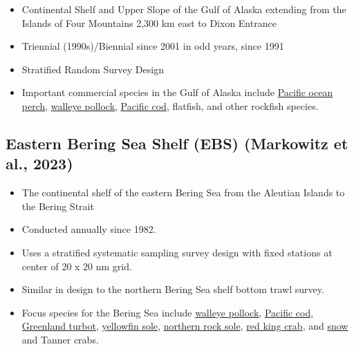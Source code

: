 \documentclass[
  letterpaper,
  oneside,
  open=any]{scrbook}
\providecommand{\tightlist}{%
  \setlength{\itemsep}{0pt}\setlength{\parskip}{0pt}}\usepackage{longtable,booktabs,array}
\begin{document}
\begin{itemize}
\tightlist
\item
  Continental Shelf and Upper Slope of the Gulf of Alaska extending from
  the Islands of Four Mountains 2,300 km east to Dixon Entrance
\item
  Triennial (1990s)/Biennial since 2001 in odd years, since 1991
\item
  Stratified Random Survey Design
\item
  Important commercial species in the Gulf of Alaska include
  \href{https://www.fisheries.noaa.gov/species/pacific-ocean-perch}{Pacific
  ocean perch},
  \href{https://www.fisheries.noaa.gov/species/alaska-pollock}{walleye
  pollock},
  \href{https://www.fisheries.noaa.gov/species/pacific-cod}{Pacific
  cod}, flatfish, and other rockfish species.
\end{itemize}

\hypertarget{eastern-bering-sea-shelf-ebs-2022nebs2023}{%
\subsection{\texorpdfstring{\textbf{Eastern Bering Sea Shelf (EBS)}
(Markowitz et al.,
2023)}{Eastern Bering Sea Shelf (EBS) (Markowitz et al., 2023)}}\label{eastern-bering-sea-shelf-ebs-2022nebs2023}}

\begin{itemize}
\tightlist
\item
  The continental shelf of the eastern Bering Sea from the Aleutian
  Islands to the Bering Strait
\item
  Conducted annually since 1982.
\item
  Uses a stratified systematic sampling survey design with fixed
  stations at center of 20 x 20 nm grid.
\item
  Similar in design to the northern Bering Sea shelf bottom trawl
  survey.
\item
  Focus species for the Bering Sea include
  \href{https://www.fisheries.noaa.gov/species/alaska-pollock}{walleye
  pollock},
  \href{https://www.fisheries.noaa.gov/species/pacific-cod}{Pacific
  cod},
  \href{https://www.fisheries.noaa.gov/species/greenland-turbot}{Greenland
  turbot},
  \href{https://www.fisheries.noaa.gov/species/yellowfin-sole}{yellowfin
  sole},
  \href{https://www.fisheries.noaa.gov/species/rock-sole}{northern rock
  sole}, \href{https://www.fisheries.noaa.gov/species/red-king-crab}{red
  king crab}, and
  \href{https://www.fisheries.noaa.gov/species/alaska-snow-crab}{snow}
  and Tanner crabs.
\end{itemize}
\end{document}
